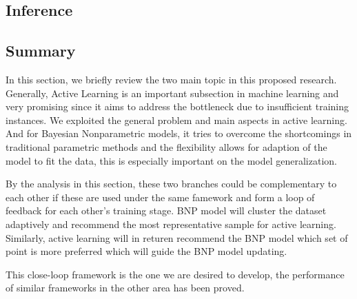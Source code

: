 \subsection{Inference}



\subsection{Summary}

In this section, we briefly review the two main topic in this proposed research. Generally, Active Learning is an important subsection in machine learning and very promising since it aims to address the bottleneck due to insufficient training instances. We exploited the general problem and main aspects in active learning. And for Bayesian Nonparametric models, it tries to overcome the shortcomings in traditional parametric methods and the flexibility allows for adaption of the model to fit the data,  this is especially important on the model generalization. 

By the analysis in this section, these two branches could be complementary to each other if these are used under the same famework and form a loop of feedback for each other's training stage. BNP model will cluster the dataset adaptively and recommend the most representative sample for active learning. Similarly, active learning will in returen recommend the BNP model which set of point is more preferred which will guide the BNP model updating. 

This close-loop framework is the one we are desired to develop, the performance of similar frameworks in the other area has been proved\cite{zhang2011close}.